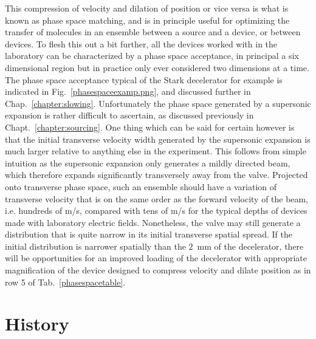 This compression of velocity and dilation of position or vice versa is what is known as phase space matching, and is in principle useful for optimizing the transfer of molecules in an ensemble between a source and a device, or between devices.
To flesh this out a bit further, all the devices worked with in the laboratory can be characterized by a phase space acceptance, in principal a six dimensional region but in practice only ever considered two dimensions at a time.
The phase space acceptance typical of the Stark decelerator for example is indicated in Fig.~\ref{phasespaceexamp.png}, and discussed further in Chap.~\ref{chapter:slowing}.
Unfortunately the phase space generated by a supersonic expansion is rather difficult to ascertain, as discussed previously in Chapt.~\ref{chapter:sourcing}.
One thing which can be said for certain however is that the initial transverse velocity width generated by the supersonic expansion is much larger relative to anything else in the experiment.
This follows from simple intuition as the supersonic expansion only generates a mildly directed beam, which therefore expands significantly transversely away from the valve.
Projected onto transverse phase space, such an ensemble should have a variation of transverse velocity that is on the same order as the forward velocity of the beam, i.e. hundreds of m/s, compared with tens of m/s for the typical depths of devices made with laboratory electric fields.
Nonetheless, the valve may still generate a distribution that is quite narrow in its initial transverse spatial spread.
If the initial distribution is narrower spatially than the $2$~mm of the decelerator, there will be opportunities for an improved loading of the decelerator with appropriate magnification of the device designed to compress velocity and dilate position as in row 5 of Tab.~\ref{phasespacetable}.


\section{History}

